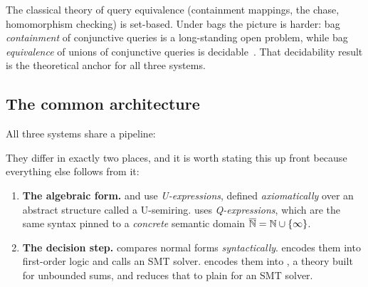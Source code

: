 The classical theory of query equivalence (containment mappings, the chase, homomorphism
checking) is set-based. Under bags the picture is harder: bag \emph{containment} of
conjunctive queries is a long-standing open problem, while bag \emph{equivalence} of unions
of conjunctive queries is decidable~\cite{cohen}. That decidability result is the
theoretical anchor for all three systems.

\subsection{The common architecture}

All three systems share a pipeline:

\begin{center}
\end{center}

They differ in exactly two places, and it is worth stating this up front because everything
else follows from it:

\begin{enumerate}
\item \textbf{The algebraic form.} \udp{} and \sqlsolver{} use \emph{U-expressions},
      defined \emph{axiomatically} over an abstract structure called a U-semiring.
      \QED{} uses \emph{Q-expressions}, which are the same syntax pinned to a
      \emph{concrete} semantic domain $\overline{\mathbb{N}} = \mathbb{N}\cup\{\infty\}$.
\item \textbf{The decision step.} \udp{} compares normal forms \emph{syntactically}.
      \QED{} encodes them into first-order logic and calls an SMT solver.
      \sqlsolver{} encodes them into \liastar{}, a theory built for unbounded sums, and
      reduces that to plain \lia{} for an SMT solver.
\end{enumerate}


